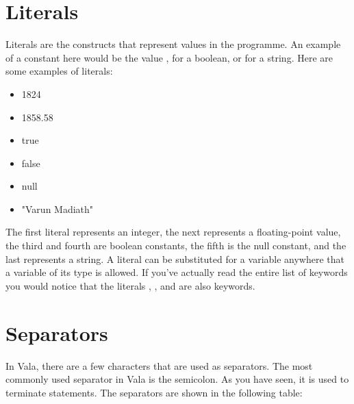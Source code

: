 \section{Literals}
Literals are the constructs that represent values in the programme. An example of a constant here would be the value , for a boolean, or  for a string. Here are some examples of literals:

\begin{itemize}
\item 1824
\item 1858.58
\item true
\item false
\item null
\item "Varun Madiath"
\end{itemize}

The first literal represents an integer, the next represents a floating-point value, the third and fourth are boolean constants, the fifth is the null constant, and the last represents a string. A literal can be substituted for a variable anywhere that a variable of its type is allowed. If you've actually read the entire list of keywords you would notice that the literals , , and  are also keywords.

\section{Separators}
In Vala, there are a few characters that are used as separators. The most commonly used separator in Vala is the semicolon. As you have seen, it is used to terminate
statements. The separators are shown in the following table:

